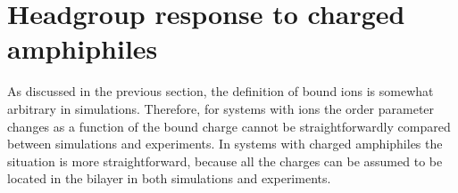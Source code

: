 \documentclass[twoside,twocolumn,9pt]{article}
\begin{document}




\section{Headgroup response to charged amphiphiles}

As discussed in the previous section, the definition of bound ions is somewhat arbitrary in simulations. Therefore, for systems with ions
the order parameter changes as a function of the bound charge cannot be straightforwardly
compared between simulations and experiments.
In systems with charged
amphiphiles the situation is more straightforward, because all the charges can be assumed 
to be located in the bilayer in both simulations and experiments.
\end{document}
